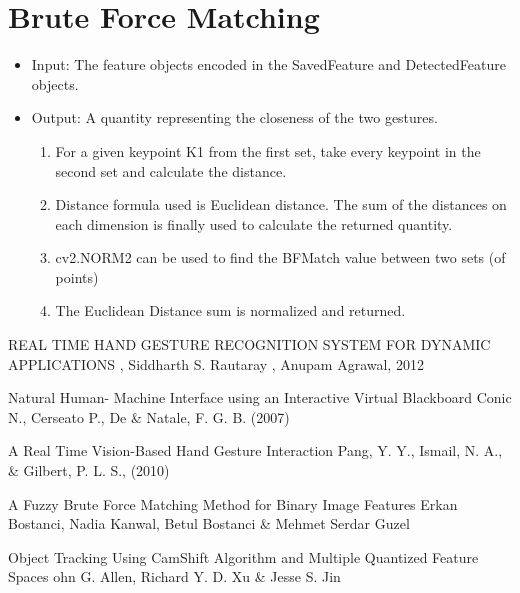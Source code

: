 \documentclass{scrreprt}
\begin{document}
\section{Brute Force Matching}
\begin{itemize}
    \item Input: The feature objects encoded in the SavedFeature and DetectedFeature objects.
    \item Output: A quantity representing the closeness of the two gestures.
    \begin{enumerate}
        \item For a given keypoint K1 from the first set, take every keypoint in the second set and calculate the distance.
        \item Distance formula used is Euclidean distance. The sum of the distances on each dimension is finally used to calculate the returned quantity.
        \item cv2.NORM2 can be used to find the BFMatch value between two sets (of points)
        \item The Euclidean Distance sum is normalized and returned.
    \end{enumerate}
\end{itemize}
\begin{thebibliography}{999}

\bibitem{ } REAL TIME HAND GESTURE RECOGNITION
SYSTEM FOR DYNAMIC APPLICATIONS , Siddharth S. Rautaray , Anupam Agrawal, 2012

\bibitem{ } Natural Human- Machine Interface using an Interactive Virtual Blackboard
Conic N., Cerseato P., De \& Natale, F. G. B. (2007)
 
\bibitem{ } A Real Time Vision-Based Hand Gesture Interaction
Pang, Y. Y., Ismail, N. A., \& Gilbert, P. L. S., (2010)

\bibitem{ } A Fuzzy Brute Force Matching Method for Binary Image Features 
Erkan Bostanci, Nadia Kanwal, Betul Bostanci \& Mehmet Serdar Guzel

\bibitem{ } Object Tracking Using CamShift Algorithm and Multiple Quantized Feature Spaces 
ohn G. Allen, Richard Y. D. Xu \& Jesse S. Jin 

\end{thebibliography}
\end{document}
